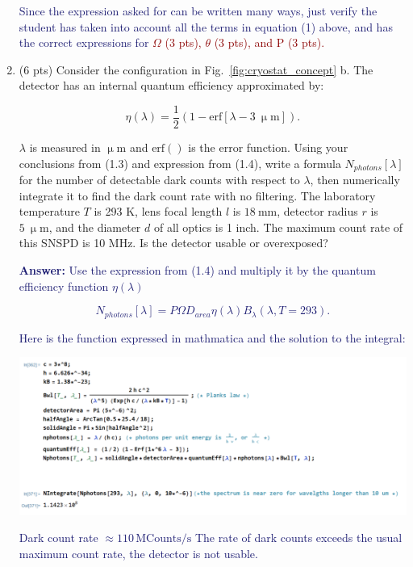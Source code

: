 \documentclass[11pt]{caltech_thesis} %
\begin{document}
\begin{enumerate}
{  }

  \textcolor{midnightblue}{ Since the expression asked for can be written many ways, just verify the student has taken into account all the terms in equation (1) above, and has the correct expressions for} \textcolor{darkred}{$\Omega$ (3 pts), $\theta$ (3 pts), and P (3 pts).}
\item
  (6 pts) Consider the configuration in Fig.~\ref{fig:cryostat_concept} b. The detector has an internal quantum efficiency approximated by:

  $$\eta(\lambda) = \frac{1}{2}(1 - \text{erf}[\lambda - 3~\mathrm{\upmu m}]).$$

  $\lambda$ is measured in $\mathrm{\upmu m}$ and $\text{erf}()$ is the error function. Using your conclusions from (1.3) and expression from (1.4), write a formula $N_{photons}[\lambda]$ for the number of detectable dark counts with respect to $\lambda$, then numerically integrate it to find the dark count rate with no filtering. The laboratory temperature $T$ is 293 K, lens focal length $l$ is $18~\text{mm}$, detector radius $r$ is $5~\mathrm{\upmu m}$, and the diameter $d$ of all optics is 1 inch. The maximum count rate of this SNSPD is 10 MHz. Is the detector usable or overexposed?

  \textcolor{midnightblue}{ \textbf{Answer:} }
  \textcolor{midnightblue}{Use the expression from (1.4) and multiply it by the quantum efficiency function $\eta(\lambda)$ }

  \textcolor{midnightblue}{

  $$N_{photons}[\lambda] = P \Omega D_{area} \eta(\lambda) B_{\lambda}(\lambda, T=293).$$

  }

  \textcolor{midnightblue}{ Here is the function expressed in mathmatica and the solution to the integral: }

  \textcolor{midnightblue}{\includegraphics{./chapter_07/figs/mathematica_2.PNG}}

  \textcolor{midnightblue}{Dark count rate $\approx \boxed{110 \,\text{MCounts/s}}$ }
  \textcolor{midnightblue}{The rate of dark counts exceeds the usual maximum count rate, the detector is not usable. }


\end{enumerate}
\end{document}
